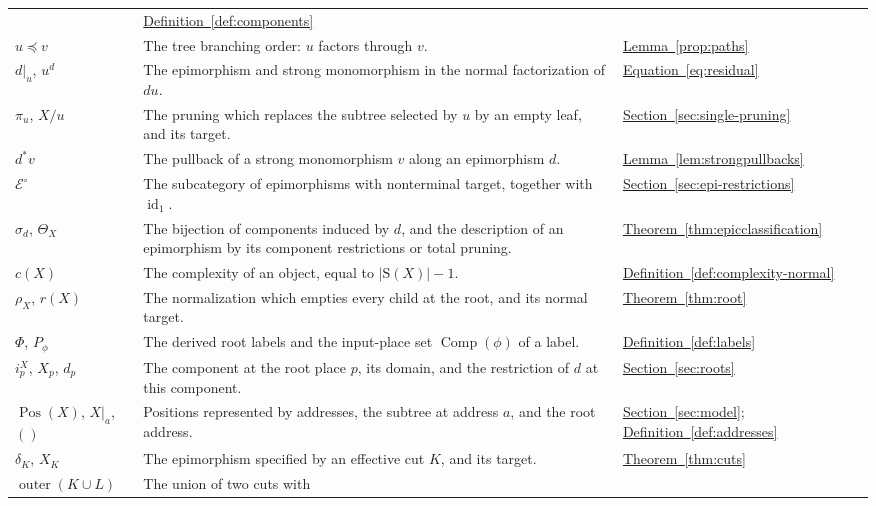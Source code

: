 \documentclass[11pt,a4paper]{article}
\theoremstyle{plain}
\theoremstyle{definition}
\theoremstyle{remark}
\newcommand{\Icat}{\mathcal E^\circ}
\newcommand{\one}{1}
\newcommand{\id}{\operatorname{id}}
\newcommand{\Occ}{\mathrm{S}}
\newcommand{\Comp}{\operatorname{Comp}}
\newcommand{\Pos}{\operatorname{Pos}}
\newcommand{\inside}{\mathrel{\preceq}}
\newcommand{\emptyword}{()}
\begin{document}
\begin{longtable}{@{}>{\raggedright\arraybackslash}p{}
                    >{\raggedright\arraybackslash}p{}
                    >{\raggedright\arraybackslash}p{}@{}}
  & \hyperref[def:components]{Definition~\ref*{def:components}}\\
$u\inside v$ & The tree branching order: $u$ factors through $v$.
  & \hyperref[prop:paths]{Lemma~\ref*{prop:paths}}\\
$d|_u$, $u^d$ & The epimorphism and strong monomorphism in the
  normal factorization of $du$.
  & \hyperref[eq:residual]{Equation~\ref*{eq:residual}}\\
$\pi_u$, $X/u$ & The pruning which replaces the subtree selected
  by $u$ by an empty leaf, and its target.
  & \hyperref[sec:single-pruning]{Section~\ref*{sec:single-pruning}}\\
$d^*v$ & The pullback of a strong monomorphism $v$ along an
  epimorphism $d$.
  & \hyperref[lem:strongpullbacks]{Lemma~\ref*{lem:strongpullbacks}}\\
$\Icat$ & The subcategory of epimorphisms with nonterminal target,
  together with $\id_\one$.
  & \hyperref[sec:epi-restrictions]{Section~\ref*{sec:epi-restrictions}}\\
$\sigma_d$, $\Theta_X$ & The bijection of components induced by
  $d$, and the description of an epimorphism by its component
  restrictions or total pruning.
  & \hyperref[thm:epicclassification]{Theorem~\ref*{thm:epicclassification}}\\
$c(X)$ & The complexity of an object, equal to $|\Occ(X)|-1$.
  & \hyperref[def:complexity-normal]{Definition~\ref*{def:complexity-normal}}\\
$\rho_X$, $r(X)$ & The normalization which empties every child
  at the root, and its normal target.
  & \hyperref[thm:root]{Theorem~\ref*{thm:root}}\\
$\Phi$, $P_\phi$ & The derived root labels and the input-place
  set $\Comp(\phi)$ of a label.
  & \hyperref[def:labels]{Definition~\ref*{def:labels}}\\
$i_p^X$, $X_p$, $d_p$ & The component at the root place $p$,
  its domain, and the restriction of $d$ at this component.
  & \hyperref[eq:ports]{Section~\ref*{sec:roots}}\\
$\Pos(X)$, $X|_a$, $\emptyword$ & Positions represented by
  addresses, the subtree at address $a$, and the root address.
  & \hyperref[sec:model]{Section~\ref*{sec:model}};
  \hyperref[def:addresses]{Definition~\ref*{def:addresses}}\\
$\delta_K$, $X_K$ & The epimorphism specified by an effective
  cut $K$, and its target.
  & \hyperref[thm:cuts]{Theorem~\ref*{thm:cuts}}\\
$\operatorname{outer}(K\cup L)$ & The union of two cuts with

\end{longtable}
\end{document}
